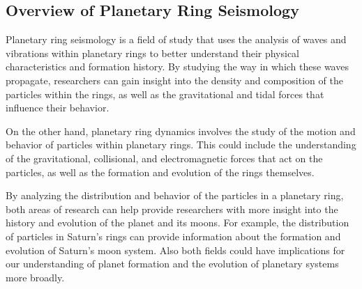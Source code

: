\documentclass{article}
\begin{document}




\subsection{Overview of Planetary Ring Seismology}

Planetary ring seismology is a field of study that uses the analysis of waves and vibrations within planetary rings to better understand their physical characteristics and formation history. By studying the way in which these waves propagate, researchers can gain insight into the density and composition of the particles within the rings, as well as the gravitational and tidal forces that influence their behavior.

On the other hand, planetary ring dynamics involves the study of the motion and behavior of particles within planetary rings. This could include the understanding of the gravitational, collisional, and electromagnetic forces that act on the particles, as well as the formation and evolution of the rings themselves.

By analyzing the distribution and behavior of the particles in a planetary ring, both areas of research can help provide researchers with more insight into the history and evolution of the planet and its moons. For example, the distribution of particles in Saturn's rings can provide information about the formation and evolution of Saturn's moon system. Also both fields could have implications for our understanding of planet formation and the evolution of planetary systems more broadly.
\end{document}
